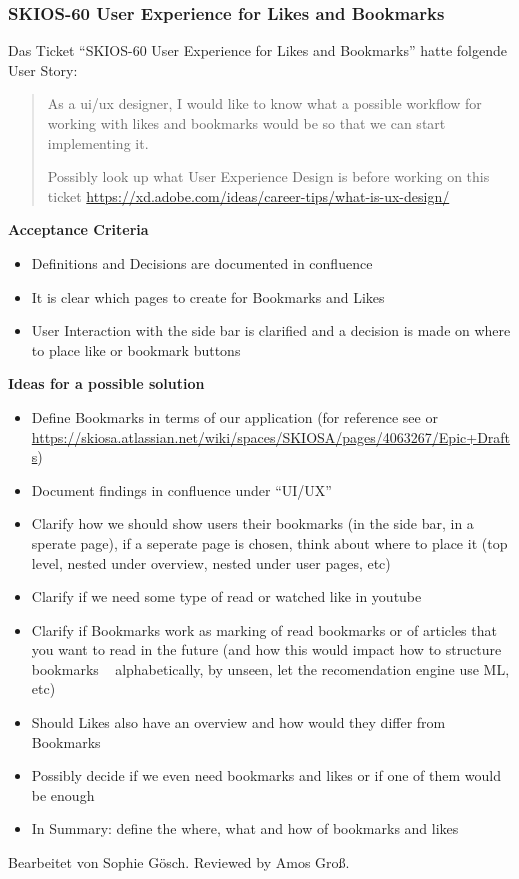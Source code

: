 \subsubsection{SKIOS-60 User Experience for Likes and Bookmarks}
Das Ticket \enquote{SKIOS-60 User Experience for Likes and Bookmarks} hatte folgende User Story:
\begin{quotation}
    As a ui/ux designer, I would like to know what a possible workflow for working with likes and bookmarks would be so that we can start implementing it.

    Possibly look up what User Experience Design is before working on this ticket \url{https://xd.adobe.com/ideas/career-tips/what-is-ux-design/}
\end{quotation}
\textbf{Acceptance Criteria}
    \begin{itemize}
        \item Definitions and Decisions are documented in confluence
        \item It is clear which pages to create for Bookmarks and Likes
        \item User Interaction with the side bar is clarified and a decision is made on where to place like or bookmark buttons
    \end{itemize}
\textbf{Ideas for a possible solution}
    \begin{itemize}
        \item Define Bookmarks in terms of our application (for reference see  or \url{https://skiosa.atlassian.net/wiki/spaces/SKIOSA/pages/4063267/Epic+Drafts})
        \item Document findings in confluence under “UI/UX”
        \item Clarify how we should show users their bookmarks (in the side bar, in a sperate page), if a seperate page is chosen, think about where to place it (top level, nested under overview, nested under user pages, etc)
        \item Clarify if we need some type of read or watched like in youtube
        \item Clarify if Bookmarks work as marking of read bookmarks or of articles that you want to read in the future (and how this would impact how to structure bookmarks  ~ alphabetically, by unseen, let the recomendation engine use ML, etc)
        \item Should Likes also have an overview and how would they differ from Bookmarks
        \item Possibly decide if we even need bookmarks and likes or if one of them would be enough
        \item In Summary: define the where, what and how of bookmarks and likes
    \end{itemize}
Bearbeitet von Sophie Gösch.
Reviewed by Amos Groß.

